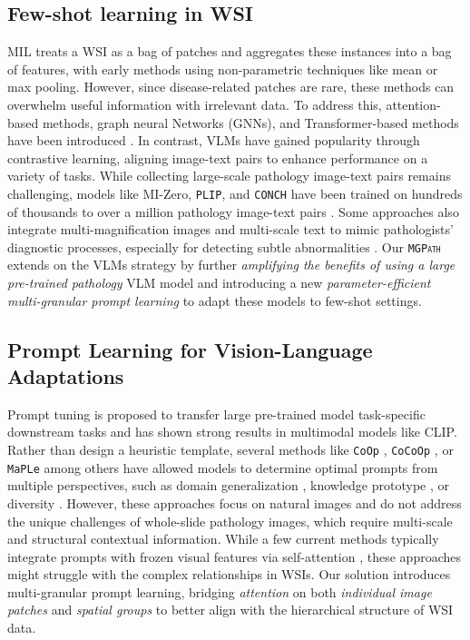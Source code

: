 \subsection{Few-shot learning in WSI}
MIL treats a WSI as a bag of patches and aggregates these instances into a bag of features, with early methods using non-parametric techniques like mean or max pooling. However, since disease-related patches are rare, these methods can overwhelm useful information with irrelevant data. To address this, attention-based methods, graph neural Networks (GNNs), and Transformer-based methods have been introduced \cite{lu2021data,chen2021whole,ilse2018attention,li2021dual,shao2021transmil,zheng2022graph}. In contrast, VLMs have gained popularity through contrastive learning, aligning image-text pairs to enhance performance on a variety of tasks. While collecting large-scale pathology image-text pairs remains challenging, models like MI-Zero, \texttt{PLIP}, and \texttt{CONCH} have been trained on hundreds of thousands to over a million pathology image-text pairs \cite{lu2023visual,huang2023visual,lu2024visual}.  Some approaches also integrate multi-magnification images and multi-scale text to mimic pathologists’ diagnostic processes, especially for detecting subtle abnormalities \cite{shi2024vila,han2024mscpt}. Our \texttt{\textsc{MGPath}} extends on the VLMs strategy by further \textit{amplifying the benefits of using a large pre-trained pathology} VLM model and introducing a new \textit{parameter-efficient multi-granular prompt learning} to adapt these models to few-shot settings.

\subsection{Prompt Learning for Vision-Language Adaptations}
Prompt tuning is proposed to transfer large pre-trained model task-specific downstream tasks and has shown strong results in multimodal models like CLIP. Rather than design a heuristic template, several methods like \texttt{CoOp} \cite{zhou2022learning}, \texttt{CoCoOp} \cite{zhou2022conditional}, or \texttt{MaPLe} \cite{khattak2023maple} among others \cite{rao2022denseclip,shu2022test} have allowed models to determine optimal prompts from multiple perspectives, such as domain generalization \cite{ge2023domain,yao2024tcp}, knowledge prototype \cite{zhang2022prompting,li2024steering}, or diversity \cite{lu2022prompt,shu2022test}. However, these approaches focus on natural images and do not address the unique challenges of whole-slide pathology images, which require multi-scale and structural contextual information. While a few current methods typically integrate prompts with frozen visual features via self-attention \cite{shi2024vila,qu2024rise}, these approaches might struggle with the complex relationships in WSIs. Our solution introduces multi-granular prompt learning, bridging \textit{attention} on both \textit{individual image patches} and \textit{spatial groups} to better align with the hierarchical structure of WSI data.